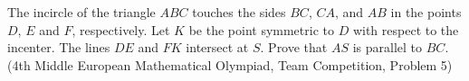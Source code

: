 The incircle of the triangle $ABC$ touches the sides $BC$,  $CA$,  and $AB$ in the points $D$,  $E$ and $F$,  respectively. Let $K$ be the point symmetric to $D$ with respect to the incenter. The lines $DE$ and $FK$ intersect at $S$. Prove that $AS$ is parallel to $BC$.(4th Middle European Mathematical Olympiad, Team Competition, Problem 5)